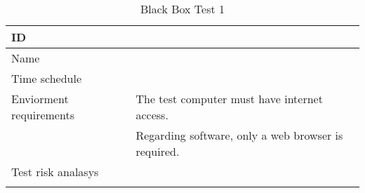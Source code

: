 {\footnotesize
\begin{longtable}{| p{5cm} | p{10cm} |}\hline
	ID 		& \\ \hline
	Name		& \\ \hline
	Time schedule	& \\ \hline
	Enviorment requirements 
		& The test computer must have internet access. \\
		& Regarding software, only a web browser is required.\\ \hline
	Test risk analasys & \\ \hline




\caption{Black Box Test 1}
\label{fig:black_box_test_1}
\end{longtable}
}
